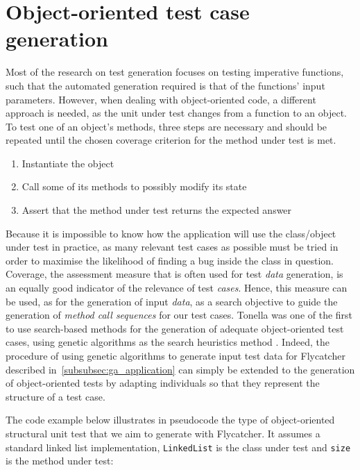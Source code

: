 \section{Object-oriented test case generation}
\label{OOtests}

Most of the research on test generation focuses on testing imperative functions, such that the automated generation required is that of the functions' input parameters. However, when dealing with object-oriented code, a different approach is needed, as the unit under test changes from a function to an object. To test one of an object's methods, three steps are necessary \cite{tonella2004evolutionary} and should be repeated until the chosen coverage criterion for the method under test is met.

\begin{enumerate}
	\item Instantiate the object
	\item Call some of its methods to possibly modify its state
	\item Assert that the method under test returns the expected answer
\end{enumerate}

Because it is impossible to know how the application will use the class/object under test in practice, as many relevant test cases as possible must be tried in order to maximise the likelihood of finding a bug inside the class in question. Coverage, the assessment measure that is often used for test \emph{data} generation, is an equally good indicator of the relevance of test \emph{cases}. Hence, this measure can be used, as for the generation of input \emph{data}, as a search objective to guide the generation of \emph{method call sequences} for our test cases. Tonella was one of the first to use search-based methods for the generation of adequate object-oriented test cases, using genetic algorithms as the search heuristics method \cite{tonella2004evolutionary}. Indeed, the procedure of using genetic algorithms to generate input test data for \textsf{Flycatcher} described in~\ref{subsubsec:ga_application} can simply be extended to the generation of object-oriented tests by adapting individuals so that they represent the structure of a test case.

The code example below illustrates in pseudocode the type of object-oriented structural unit test that we aim to generate with \textsf{Flycatcher}. It assumes a standard linked list implementation, \texttt{LinkedList} is the class under test and \texttt{size} is the method under test:

